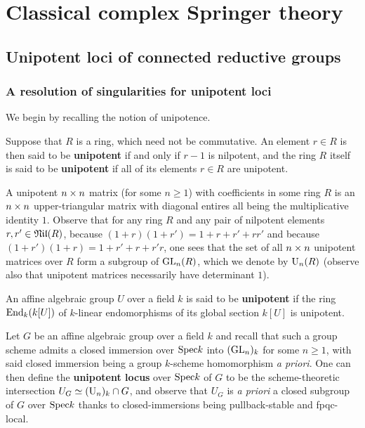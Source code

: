 \section{Classical complex Springer theory}
    \subsection{Unipotent loci of connected reductive groups}
        \subsubsection{A resolution of singularities for unipotent loci}
            We begin by recalling the notion of unipotence.
            \begin{definition} \label{def: unipotent_elements}
                Suppose that $R$ is a ring, which need not be commutative. An element $r \in R$ is then said to be \textbf{unipotent} if and only if $r - 1$ is nilpotent, and the ring $R$ itself is said to be \textbf{unipotent} if all of its elements $r \in R$ are unipotent. 
            \end{definition}
            \begin{example} \label{example: unipotent_matrices}
                A unipotent $n \x n$ matrix (for some $n \geq 1$) with coefficients in some ring $R$ is an $n \x n$ upper-triangular matrix with diagonal entires all being the multiplicative identity $1$. Observe that for any ring $R$ and any pair of nilpotent elements $r, r' \in \mathfrak{Nil}(R)$, because $(1 + r)(1 + r') = 1 + r + r' + rr'$ and because $(1 + r')(1 + r) = 1 + r' + r + r'r$, one sees that the set of all $n \x n$ unipotent matrices over $R$ form a subgroup of $\operatorname{GL}_n(R)$, which we denote by $\mathrm{U}_n(R)$ (observe also that unipotent matrices necessarily have determinant $1$).
            \end{example}
            \begin{definition} \label{def: unipotent_algebraic_groups}
                An affine algebraic group $U$ over a field $k$ is said to be \textbf{unipotent} if the ring $\mathrm{End}_k(k[U])$ of $k$-linear endomorphisms of its global section $k[U]$ is unipotent.
            \end{definition}
            \begin{remark} \label{remark: the_unipotence_locus_of_an_affine_algebraic_group}
                Let $G$ be an affine algebraic group over a field $k$ and recall that such a group scheme admits a closed immersion over $\mathrm{Spec} k$ into $(\operatorname{GL}_n)_k$ for some $n \geq 1$, with said closed immersion being a group $k$-scheme homomorphism \textit{a priori}. One can then define the \textbf{unipotent locus} over $\mathrm{Spec} k$ of $G$ to be the scheme-theoretic intersection $U_G \simeq (\mathrm{U}_n)_k \cap G$, and observe that $U_G$ is \textit{a priori} a closed subgroup of $G$ over $\mathrm{Spec} k$ thanks to closed-immersions being pullback-stable and fpqc-local.
            \end{remark}
            
